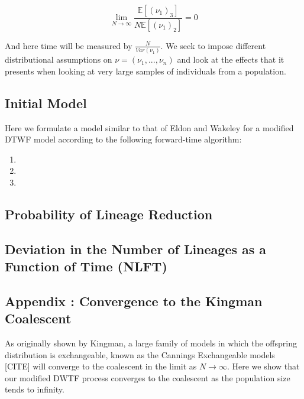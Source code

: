 \documentclass[11pt]{article}
\begin{document}
\begin{equation}
	\lim_{N \rightarrow \infty} \frac{\mathbb{E}[(\nu_1)_3]}{N \mathbb{E}[(\nu_1)_2]} = 0
\end{equation}

And here time will be measured by $\frac{N}{Var(\nu_1)}$. We seek to impose different distributional assumptions on  $\nu = (\nu_1, ...,\nu_n)$ and look at the effects that it presents when looking at very large samples of individuals from a population. 

\subsection{Initial Model}

Here we formulate a model similar to that of Eldon and Wakeley\cite{Eldon2006} for a modified DTWF model according to the following forward-time algorithm:

\begin{enumerate}
	\item
	\item 
	\item
\end{enumerate}



\subsection{Probability of Lineage Reduction}





\subsection{Deviation in the Number of Lineages as a Function of Time (NLFT)}







{}



\subsection{Appendix :  Convergence to the Kingman Coalescent}

As originally shown by Kingman, a large family of models in which the offspring distribution is exchangeable, known as the Cannings Exchangeable models [CITE] will converge to the coalescent in the limit as $N \rightarrow \infty$. Here we show that our modified DWTF process converges to the coalescent as the population size tends to infinity.
\end{document}

